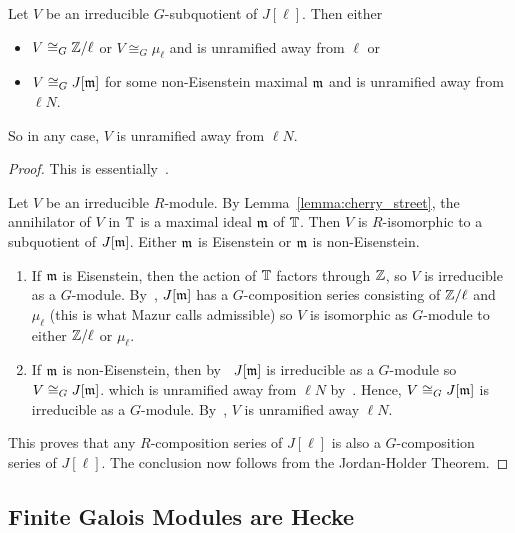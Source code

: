\documentclass{article}
\begin{document}
\begin{theorem}\label{theorem:irreducible_G_sub}
    Let $V$ be an irreducible $G$-subquotient of $J[\ell]$. Then either
    \begin{itemize}
        \item
            $V\cong_G \mathbb{Z}/\ell$ or $V\cong_G \mu_\ell$ and is unramified away
            from $\ell$ or
        \item 
            $V\cong_G J[\mathfrak{m}]$ for some non-Eisenstein maximal $\mathfrak{m}$ and is
            unramified away from $\ell N$.
    \end{itemize}
    So in any case, $V$ is unramified away from $\ell N$.
\end{theorem}
\begin{proof}
    This is essentially~\cite[\S 14]{mazur:eisenstein}. 

    Let $V$ be an irreducible $R$-module. By Lemma~\ref{lemma:cherry_street},
    the annihilator of $V$ in $\mathbb{T}$ is a maximal ideal $\mathfrak{m}$ of $\mathbb{T}$. Then $V$
    is $R$-isomorphic to a subquotient of $J[\mathfrak{m}]$. Either $\mathfrak{m}$ is Eisenstein or
    $\mathfrak{m}$ is non-Eisenstein.
    \begin{enumerate}
        \item
            If $\mathfrak{m}$ is Eisenstein, then the action of $\mathbb{T}$ factors through
            $\mathbb{Z}$, so $V$ is irreducible as a $G$-module. By~\cite[Proposition
            14.1]{mazur:eisenstein}, $J[\mathfrak{m}]$ has a $G$-composition series
            consisting of $\mathbb{Z}/\ell$ and $\mu_\ell$ (this is what Mazur calls
            admissible) so $V$ is isomorphic as $G$-module to either $\mathbb{Z}/\ell$
            or $\mu_\ell$.
        \item
            If $\mathfrak{m}$ is non-Eisenstein, then by~\cite[Proposition
            14.2]{mazur:eisenstein} $J[\mathfrak{m}]$ is irreducible as a $G$-module so
            $V\cong_G J[\mathfrak{m}]$. which is unramified away from $\ell N$
            by~\cite[Theorem 6.7]{deligne-serre}. Hence, $V\cong_G J[\mathfrak{m}]$ is
            irreducible as a $G$-module. By~\cite[Theorem 6.7]{deligne-serre},
            $V$ is unramified away $\ell N$.
    \end{enumerate}
    This proves that any $R$-composition series of $J[\ell]$ is also a
    $G$-composition series of $J[\ell]$. The conclusion now follows from the
    Jordan-Holder Theorem.
\end{proof} 

\subsection{Finite Galois Modules are Hecke}
\end{document}
